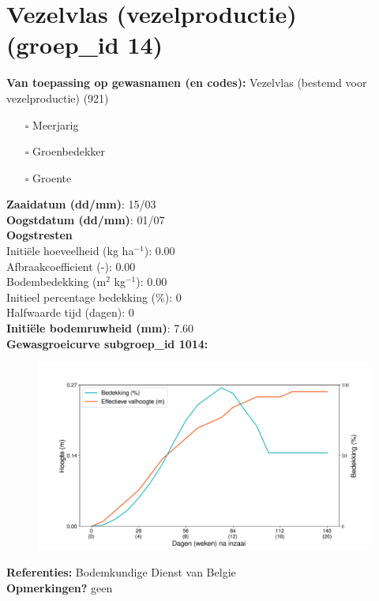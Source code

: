 \documentclass{article}
\begin{document}
 \section{Vezelvlas (vezelproductie) (groep\_id 14)} 
 \textbf{Van toepassing op gewasnamen (en codes):} Vezelvlas (bestemd voor vezelproductie) (921) 
 \begin{multicols}{3} \begin{itemize} \item[$\square$] Meerjarig \item[$\square$] Groenbedekker \item[$\square$] Groente \end{itemize} \end{multicols} 
  \textbf{Zaaidatum (dd/mm)}: 15/03  \vspace{0.10cm} \\ 
  \textbf{Oogstdatum (dd/mm)}: 01/07  \vspace{0.10cm} \\ 
  \textbf{Oogstresten} \vspace{0.05cm} \\ 
  \tab Initi\"{e}le hoeveelheid (kg ha$^{-1}$): 0.00 \vspace{0.05cm} \\ 
  \tab Afbraakcoefficient (-): 0.00 \vspace{0.05cm} \\ 
  \tab Bodembedekking (m$^2$ kg$^{-1}$): 0.00 \vspace{0.05cm} \\ 
  \tab Initieel percentage bedekking (\%): 0 \vspace{0.05cm} \\ 
  \tab Halfwaarde tijd (dagen): 0 \vspace{0.05cm} \\ 
  \textbf{Initi\"{e}le bodemruwheid (mm)}: 7.60 \vspace{0.05cm} \\ 
  \textbf{Gewasgroeicurve subgroep\_id 1014:} 
 \begin{center} \begin{figure}[H] \includegraphics[width=12.5cm]{temp/1014.png} \end{figure} \end{center} 
  \textbf{Referenties:} Bodemkundige Dienst van Belgie \vspace{0.10cm} \\ 
  \textbf{Opmerkingen?} geen \vspace{0.10cm} \\ 
 \newpage 
\end{document}
